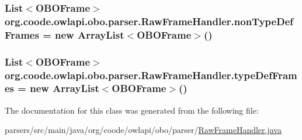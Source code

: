 \hypertarget{classorg_1_1coode_1_1owlapi_1_1obo_1_1parser_1_1_raw_frame_handler_a9290fef71b85126ea834a8597ebf0875}{
\subsubsection[{non\-Type\-Def\-Frames}]{\setlength{\rightskip}{0pt plus 5cm}List$<${\bf O\-B\-O\-Frame}$>$ org.\-coode.\-owlapi.\-obo.\-parser.\-Raw\-Frame\-Handler.\-non\-Type\-Def\-Frames = new Array\-List$<${\bf O\-B\-O\-Frame}$>$()\hspace{0.3cm}{\ttfamily [private]}}}\label{classorg_1_1coode_1_1owlapi_1_1obo_1_1parser_1_1_raw_frame_handler_a9290fef71b85126ea834a8597ebf0875}
\hypertarget{classorg_1_1coode_1_1owlapi_1_1obo_1_1parser_1_1_raw_frame_handler_a55681877c45eeec1612b467c968e3933}{
\subsubsection[{type\-Def\-Frames}]{\setlength{\rightskip}{0pt plus 5cm}List$<${\bf O\-B\-O\-Frame}$>$ org.\-coode.\-owlapi.\-obo.\-parser.\-Raw\-Frame\-Handler.\-type\-Def\-Frames = new Array\-List$<${\bf O\-B\-O\-Frame}$>$()\hspace{0.3cm}{\ttfamily [private]}}}\label{classorg_1_1coode_1_1owlapi_1_1obo_1_1parser_1_1_raw_frame_handler_a55681877c45eeec1612b467c968e3933}


The documentation for this class was generated from the following file\-:\begin{DoxyCompactItemize}
\item 
parsers/src/main/java/org/coode/owlapi/obo/parser/\hyperlink{_raw_frame_handler_8java}{Raw\-Frame\-Handler.\-java}\end{DoxyCompactItemize}
